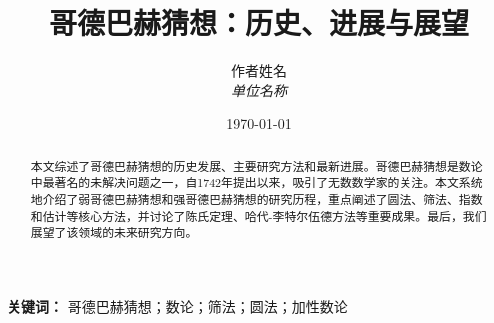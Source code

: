 \documentclass[12pt,a4paper]{article}
\title{哥德巴赫猜想：历史、进展与展望}
\author{
    作者姓名\\
    \textit{单位名称}
}
\date{\today}
\numberwithin{equation}{section}
\begin{document}
\maketitle

\begin{abstract}
    本文综述了哥德巴赫猜想的历史发展、主要研究方法和最新进展。哥德巴赫猜想是数论中最著名的未解决问题之一，自1742年提出以来，吸引了无数数学家的关注。本文系统地介绍了弱哥德巴赫猜想和强哥德巴赫猜想的研究历程，重点阐述了圆法、筛法、指数和估计等核心方法，并讨论了陈氏定理、哈代-李特尔伍德方法等重要成果。最后，我们展望了该领域的未来研究方向。
\end{abstract}

\textbf{关键词：} 哥德巴赫猜想；数论；筛法；圆法；加性数论

\tableofcontents
\newpage












\appendix

\end{document}
